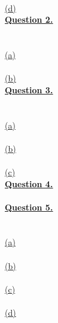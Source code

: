 \documentclass[12pt]{article}
\begin{document}
~\\\hyperlink{toc}{\hypertarget{1.4}{(d)}}\\
\newpage
\hyperlink{toc}{\LARGE \underline{\textbf{Question 2.}}}\\\\
~\\\hyperlink{toc}{\hypertarget{2.1}{(a)}}\\
~\\\hyperlink{toc}{\hypertarget{2.2}{(b)}}\\
\newpage
\hyperlink{toc}{{\LARGE \underline{\textbf{Question 3.}}}}\\\\
~\\\hyperlink{toc}{\hypertarget{3.1}{(a)}}\\
~\\\hyperlink{toc}{\hypertarget{3.2}{(b)}}\\
~\\\hyperlink{toc}{\hypertarget{3.3}{(c)}}\\
\newpage
\hyperlink{toc}{\hypertarget{4}{\LARGE \underline{\textbf{Question 4.}}}}\\\\
\newpage
\hyperlink{toc}{{\LARGE \underline{\textbf{Question 5.}}}}\\\\
~\\\hyperlink{toc}{\hypertarget{5.1}{(a)}}\\
~\\\hyperlink{toc}{\hypertarget{5.2}{(b)}}\\
~\\\hyperlink{toc}{\hypertarget{5.3}{(c)}}\\
~\\\hyperlink{toc}{\hypertarget{5.4}{(d)}}\\
\newpage
\end{document}
